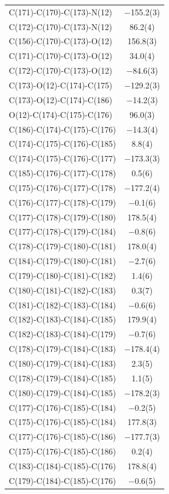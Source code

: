 \begin{center}
{\begin{supertabular}{p{1.8in}c}
C(171)-C(170)-C(173)-N(12)&$-$155.2(3)\\
C(172)-C(170)-C(173)-N(12)&86.2(4)\\
C(156)-C(170)-C(173)-O(12)&156.8(3)\\
C(171)-C(170)-C(173)-O(12)&34.0(4)\\
C(172)-C(170)-C(173)-O(12)&$-$84.6(3)\\
C(173)-O(12)-C(174)-C(175)&$-$129.2(3)\\
C(173)-O(12)-C(174)-C(186)&$-$14.2(3)\\
O(12)-C(174)-C(175)-C(176)&96.0(3)\\
C(186)-C(174)-C(175)-C(176)&$-$14.3(4)\\
C(174)-C(175)-C(176)-C(185)&8.8(4)\\
C(174)-C(175)-C(176)-C(177)&$-$173.3(3)\\
C(185)-C(176)-C(177)-C(178)&0.5(6)\\
C(175)-C(176)-C(177)-C(178)&$-$177.2(4)\\
C(176)-C(177)-C(178)-C(179)&$-$0.1(6)\\
C(177)-C(178)-C(179)-C(180)&178.5(4)\\
C(177)-C(178)-C(179)-C(184)&$-$0.8(6)\\
C(178)-C(179)-C(180)-C(181)&178.0(4)\\
C(184)-C(179)-C(180)-C(181)&$-$2.7(6)\\
C(179)-C(180)-C(181)-C(182)&1.4(6)\\
C(180)-C(181)-C(182)-C(183)&0.3(7)\\
C(181)-C(182)-C(183)-C(184)&$-$0.6(6)\\
C(182)-C(183)-C(184)-C(185)&179.9(4)\\
C(182)-C(183)-C(184)-C(179)&$-$0.7(6)\\
C(178)-C(179)-C(184)-C(183)&$-$178.4(4)\\
C(180)-C(179)-C(184)-C(183)&2.3(5)\\
C(178)-C(179)-C(184)-C(185)&1.1(5)\\
C(180)-C(179)-C(184)-C(185)&$-$178.2(3)\\
C(177)-C(176)-C(185)-C(184)&$-$0.2(5)\\
C(175)-C(176)-C(185)-C(184)&177.8(3)\\
C(177)-C(176)-C(185)-C(186)&$-$177.7(3)\\
C(175)-C(176)-C(185)-C(186)&0.2(4)\\
C(183)-C(184)-C(185)-C(176)&178.8(4)\\
C(179)-C(184)-C(185)-C(176)&$-$0.6(5)\\

\end{supertabular}}
\end{center}
